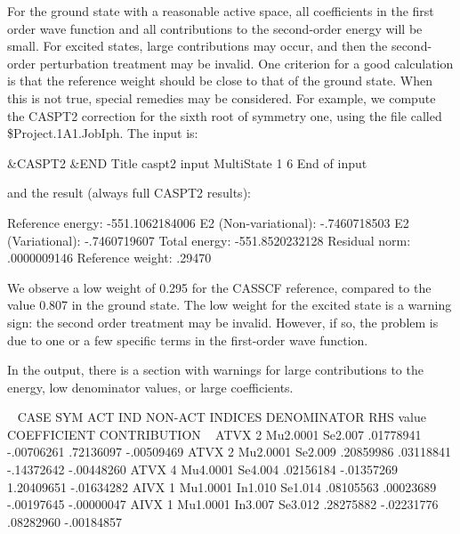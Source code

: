 
For the ground state with a reasonable active space, all coefficients in the
first order wave function and all contributions to the second-order energy
will be small. For excited states, large contributions may occur, and then the
second-order perturbation treatment may be invalid. One criterion for a good
calculation is that the reference weight should be close to that of the ground
state. When this is not true, special remedies may be considered.
For example, we compute the CASPT2 correction for the sixth root of symmetry
one, using the  file called \$Project.1A1.JobIph. The input is:

\begin{inputlisting}
 &CASPT2 &END                                                                   
Title                                                                           
 caspt2 input                                                                    
MultiState
1 6
End of input                                                                    
\end{inputlisting}

and the result (always full CASPT2 results):

\begin{sourcelisting}
      Reference energy:        -551.1062184006
      E2 (Non-variational):       -.7460718503
      E2 (Variational):           -.7460719607
      Total energy:            -551.8520232128
      Residual norm:               .0000009146
      Reference weight:            .29470
\end{sourcelisting}

We observe a low weight of 0.295 for the CASSCF reference,
compared to the value 0.807 in the ground state. The low weight for
the excited state is a warning sign: the second order treatment may
be invalid. However, if so, the problem is due to one or a few
specific terms in the first-order wave function.


In the output, there is a section with warnings for
large contributions to the energy, low denominator values, or large
coefficients.
\begin{sourcelisting}
~
CASE  SYM   ACT IND   NON-ACT INDICES  DENOMINATOR  RHS value  COEFFICIENT CONTRIBUTION
~
ATVX   2   Mu2.0001   Se2.007           .01778941  -.00706261   .72136097  -.00509469
ATVX   2   Mu2.0001   Se2.009           .20859986   .03118841  -.14372642  -.00448260
ATVX   4   Mu4.0001   Se4.004           .02156184  -.01357269  1.20409651  -.01634282
AIVX   1   Mu1.0001   In1.010 Se1.014   .08105563   .00023689  -.00197645  -.00000047
AIVX   1   Mu1.0001   In3.007 Se3.012   .28275882  -.02231776   .08282960  -.00184857

\end{sourcelisting}

